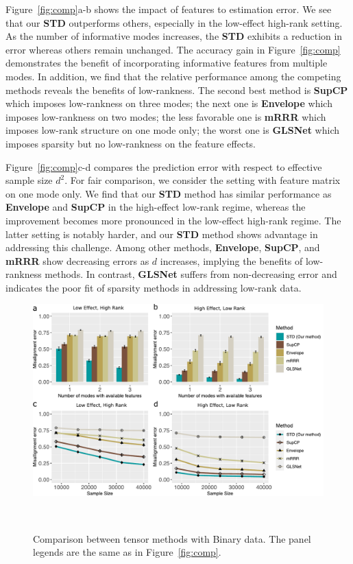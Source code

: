 \documentclass[12pt]{article}
\theoremstyle{definition}
\theoremstyle{definition}
\begin{document}
{\color{blue}Figure~\ref{fig:comp}a-b shows the impact of features to estimation error. We see that our \textbf{STD} outperforms others, especially in the low-effect high-rank setting. As the number of informative modes increases, the \textbf{STD} exhibits a reduction in error whereas others remain unchanged. The accuracy gain in Figure~\ref{fig:comp} demonstrates the benefit of incorporating informative features from multiple modes. In addition, we find that the relative performance among the competing methods reveals the benefits of low-rankness. 
The second best method is \textbf{SupCP} which imposes low-rankness on three modes; the next one is \textbf{Envelope} which imposes low-rankness on two modes; the less favorable one is \textbf{mRRR} which imposes low-rank structure on one mode only; the worst one is \textbf{GLSNet} which imposes sparsity but no low-rankness on the feature effects. 

Figure~\ref{fig:comp}c-d compares the prediction error with respect to effective sample size $d^2$. For fair comparison, we consider the setting with feature matrix on one mode only. We find that our \textbf{STD} method has similar performance as \textbf{Envelope} and \textbf{SupCP} in the high-effect low-rank regime, whereas the improvement becomes more pronounced in the low-effect high-rank regime. The latter setting is notably harder, and our \textbf{STD} method shows advantage in addressing this challenge. Among other methods, \textbf{Envelope}, \textbf{SupCP}, and \textbf{mRRR} show decreasing errors as $d$ increases, implying the benefits of low-rankness methods. In contrast, \textbf{GLSNet} suffers from non-decreasing error and indicates the poor fit of sparsity methods in addressing low-rank data. 

\begin{figure}[t]
\centering
\includegraphics[width=12cm]{comp_final_binary.pdf} 
\caption{Comparison between tensor methods with Binary data. The panel legends are the same as in Figure~\ref{fig:comp}.}~\label{fig:comp_b}
\vspace{-.5cm}
\end{figure}

}
\end{document}
